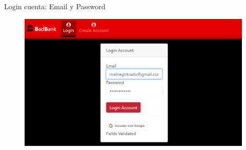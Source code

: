 \documentclass[xcolor=pdftex,dvipsnames,table]{beamer}
\begin{document}
\begin{frame}{Login cuenta: Email y Password}
    \begin{figure}[htb]
        \centering
        \captionsetup{justification=centering,margin=0.3cm}
        \includegraphics[width=1\linewidth]{func/LOGIN.png}
    \end{figure}
\end{frame}
\end{document}
